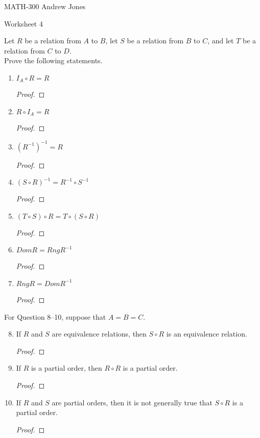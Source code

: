 \documentclass{article}
\begin{document}
    MATH-300 \hfill Andrew Jones
  \begin{center}
  {\huge Worksheet 4}
  \end{center}
  Let $R$ be a relation from $A$ to $B$, let $S$ be a relation from $B$ to $C$, and let $T$ be a relation from $C$ to $D$. \\ Prove the following statements. \\
  \begin{enumerate}
    \item $I_A \circ R = R$
      \begin{proof}
        
      \end{proof}
    \item $R \circ I_A = R$
      \begin{proof}
        
      \end{proof}
    \item $(R^{-1})^{-1} = R$
      \begin{proof}
        
      \end{proof}
    \item $(S \circ R)^{-1} = R^{-1}\circ S^{-1}$
      \begin{proof}
        
      \end{proof}
    \item $(T \circ S) \circ R = T \circ (S \circ R)$
      \begin{proof}
        
      \end{proof}
    \item $Dom R = Rng R^{-1}$
      \begin{proof}
        
      \end{proof}
    \item $Rng R = Dom R^{-1}$
      \begin{proof}
        
      \end{proof}
  \end{enumerate}
  For Question 8–10, suppose that $A = B = C$.
  \begin{enumerate} \setcounter{enumi}{7}
    \item If $R$ and $S$ are equivalence relations, then $S \circ R$ is an equivalence relation.
      \begin{proof}
        
      \end{proof}
    \item If $R$ is a partial order, then $R \circ R$ is a partial order.
      \begin{proof}
        
      \end{proof}
    \item If $R$ and $S$ are partial orders, then it is not generally true that $S \circ R$ is a partial order.
      \begin{proof}
        
      \end{proof}
  \end{enumerate}
\end{document}
